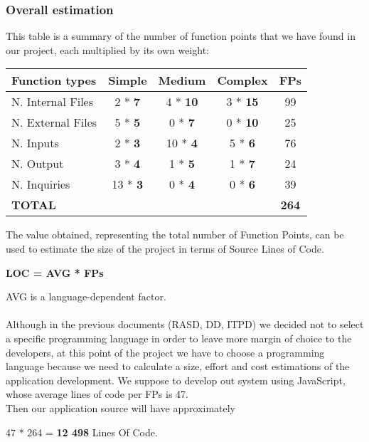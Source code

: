 \subsubsection{Overall estimation}

This table is a summary of the number of function points that we have found in our project, each multiplied by its own weight:

\begin{center}
	\begin{tabular}{|l|c|c|c||c|}
		\hline
		\textbf{Function types} 	& \textbf{Simple} 	& \textbf{Medium} 	& \textbf{Complex}	& \textbf{FPs} \\
		\hline
		N. Internal Files 	& 2 * \textbf{7} 	& 4 * \textbf{10} 	& 3 * \textbf{15} & 99 \\
		\hline
		N. External Files 	& 5 * \textbf{5} 	& 0 * \textbf{7} 	& 0 * \textbf{10} & 25 \\
		\hline
		N. Inputs 	& 2 * \textbf{3} 	& 10 * \textbf{4} 	& 5 * \textbf{6} & 76  \\
		\hline
		N. Output 	& 3 * \textbf{4} 	& 1 * \textbf{5} 	& 1 * \textbf{7} & 24 \\
		\hline
		N. Inquiries 	& 13 * \textbf{3} 	& 0 * \textbf{4} 	& 0 * \textbf{6}  & 39\\	
		\hline \hline
		\textbf{TOTAL} 	&  	& 	& 	& \textbf{264} \\
		\hline
	\end{tabular}
\end{center}

The value obtained, representing the total number of Function Points, can be used to estimate the size of the project in terms of Source Lines of Code. \\
\begin{center}
	\textbf{LOC = AVG * FPs}
\end{center}
AVG is a language-dependent factor. \\
\\
Although in the previous documents (RASD, DD, ITPD) we decided not to select a specific programming language in order to leave more margin of choice to the developers, at this point of the project we have to choose a programming language because we need to calculate a size, effort and cost estimations of the application development.
We suppose to develop out system using JavaScript, whose average lines of code per FPs is 47.\\
Then our application source will have approximately 
\begin{center}
	47 * 264 = \textbf{12 498} Lines Of Code.
\end{center}
